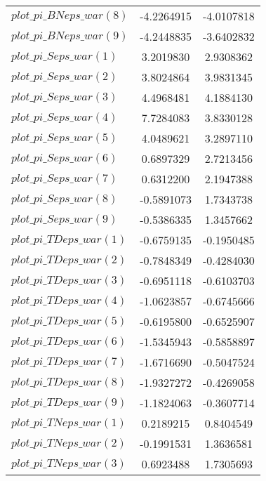 \begin{center}
\begin{longtable}{lcc}
$plot\_pi\_BN eps\_war (8)   $	 & 	     -4.2264915	 & 	     -4.0107818 \\ 
$plot\_pi\_BN eps\_war (9)   $	 & 	     -4.2448835	 & 	     -3.6402832 \\ 
$plot\_pi\_S eps\_war (1)    $	 & 	      3.2019830	 & 	      2.9308362 \\ 
$plot\_pi\_S eps\_war (2)    $	 & 	      3.8024864	 & 	      3.9831345 \\ 
$plot\_pi\_S eps\_war (3)    $	 & 	      4.4968481	 & 	      4.1884130 \\ 
$plot\_pi\_S eps\_war (4)    $	 & 	      7.7284083	 & 	      3.8330128 \\ 
$plot\_pi\_S eps\_war (5)    $	 & 	      4.0489621	 & 	      3.2897110 \\ 
$plot\_pi\_S eps\_war (6)    $	 & 	      0.6897329	 & 	      2.7213456 \\ 
$plot\_pi\_S eps\_war (7)    $	 & 	      0.6312200	 & 	      2.1947388 \\ 
$plot\_pi\_S eps\_war (8)    $	 & 	     -0.5891073	 & 	      1.7343738 \\ 
$plot\_pi\_S eps\_war (9)    $	 & 	     -0.5386335	 & 	      1.3457662 \\ 
$plot\_pi\_TD eps\_war (1)   $	 & 	     -0.6759135	 & 	     -0.1950485 \\ 
$plot\_pi\_TD eps\_war (2)   $	 & 	     -0.7848349	 & 	     -0.4284030 \\ 
$plot\_pi\_TD eps\_war (3)   $	 & 	     -0.6951118	 & 	     -0.6103703 \\ 
$plot\_pi\_TD eps\_war (4)   $	 & 	     -1.0623857	 & 	     -0.6745666 \\ 
$plot\_pi\_TD eps\_war (5)   $	 & 	     -0.6195800	 & 	     -0.6525907 \\ 
$plot\_pi\_TD eps\_war (6)   $	 & 	     -1.5345943	 & 	     -0.5858897 \\ 
$plot\_pi\_TD eps\_war (7)   $	 & 	     -1.6716690	 & 	     -0.5047524 \\ 
$plot\_pi\_TD eps\_war (8)   $	 & 	     -1.9327272	 & 	     -0.4269058 \\ 
$plot\_pi\_TD eps\_war (9)   $	 & 	     -1.1824063	 & 	     -0.3607714 \\ 
$plot\_pi\_TN eps\_war (1)   $	 & 	      0.2189215	 & 	      0.8404549 \\ 
$plot\_pi\_TN eps\_war (2)   $	 & 	     -0.1991531	 & 	      1.3636581 \\ 
$plot\_pi\_TN eps\_war (3)   $	 & 	      0.6923488	 & 	      1.7305693 \\ 

\end{longtable}
\end{center}
